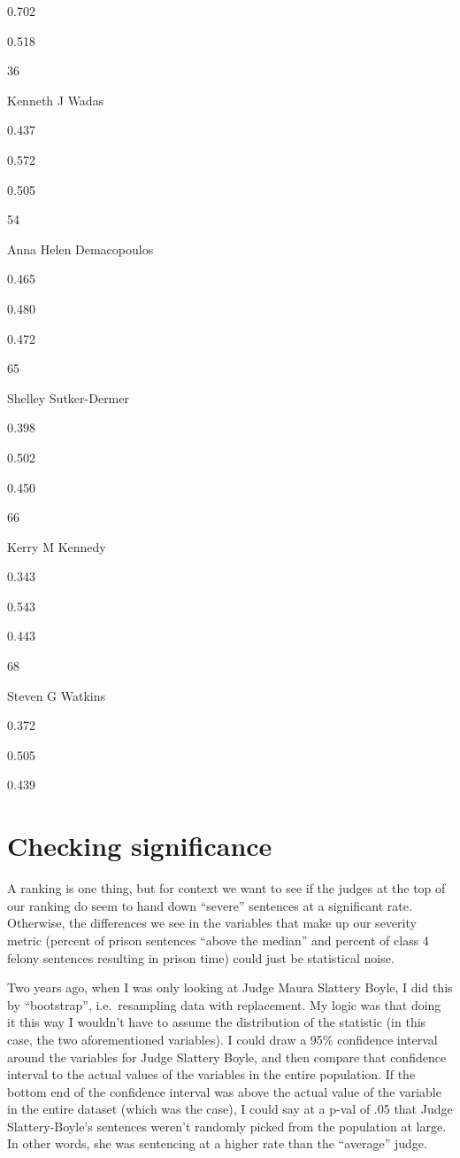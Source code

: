\documentclass[
]{article}
\begin{document}
0.702

0.518

36

Kenneth J Wadas

0.437

0.572

0.505

54

Anna Helen Demacopoulos

0.465

0.480

0.472

65

Shelley Sutker-Dermer

0.398

0.502

0.450

66

Kerry M Kennedy

0.343

0.543

0.443

68

Steven G Watkins

0.372

0.505

0.439

\hypertarget{checking-significance}{%
\section{Checking significance}\label{checking-significance}}

A ranking is one thing, but for context we want to see if the judges at
the top of our ranking do seem to hand down ``severe'' sentences at a
significant rate. Otherwise, the differences we see in the variables
that make up our severity metric (percent of prison sentences ``above
the median'' and percent of class 4 felony sentences resulting in prison
time) could just be statistical noise.

Two years ago, when I was only looking at Judge Maura Slattery Boyle, I
did this by ``bootstrap'', i.e.~resampling data with replacement. My
logic was that doing it this way I wouldn't have to assume the
distribution of the statistic (in this case, the two aforementioned
variables). I could draw a 95\% confidence interval around the variables
for Judge Slattery Boyle, and then compare that confidence interval to
the actual values of the variables in the entire population. If the
bottom end of the confidence interval was above the actual value of the
variable in the entire dataset (which was the case), I could say at a
p-val of .05 that Judge Slattery-Boyle's sentences weren't randomly
picked from the population at large. In other words, she was sentencing
at a higher rate than the ``average'' judge.
\end{document}
